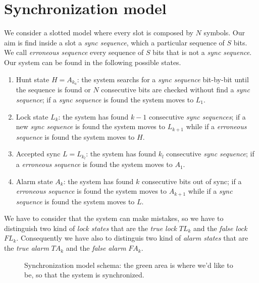 \section{Synchronization model}
We consider a slotted model where every slot is composed by $N$ symbols. Our aim is find inside a slot a \textit{sync sequence}, which a particular sequence of $S$ bits. We call \textit{erroneous sequence} every sequence of $S$ bits that is not a \textit{sync sequence}.
Our system can be found in the following possible states.
\begin{enumerate}
	\item Hunt state $H=A_{k_a}$: the system searchs for a \textit{sync sequence} bit-by-bit until the sequence is found or $N$ consecutive bits are checked without find a \textit{sync sequence}; if a \textit{sync sequence} is found the system moves to $L_1$.
	\item Lock state $L_k$: the system has found $k-1$ consecutive \textit{sync sequences}; if a new \textit{sync sequence} is found the system moves to $L_{k+1}$ while if a \textit{erroneous sequence} is found the system moves to $H$.
	\item Accepted sync $L=L_{k_l}$: the system has found $k_l$ consecutive \textit{sync sequence}; if a \textit{erroneous sequence} is found the system moves to $A_1$.
	\item Alarm state $A_k$: the system has found $k$ consecutive bits out of sync; if a \textit{erroneous sequence} is found the system moves to $A_{k+1}$ while if a \textit{sync sequence} is found the system moves to $L$.
\end{enumerate}

We have to consider that the system can make mistakes, so we have to distinguish two kind of \textit{lock states} that are the \textit{true lock} $TL_k$ and the \textit{false lock} $FL_k$. Consequently we have also to distinguis two kind of \textit{alarm states} that are the \textit{true alarm} $TA_k$ and the \textit{false alarm} $FA_k$.

\begin{figure}
	\centering
	\resizebox{\textwidth}{!}{}
	\caption{Synchronization model schema: the green area is where we'd like to be, so that the system is synchronized.}
	\label{fig:syncmodel}
\end{figure}

